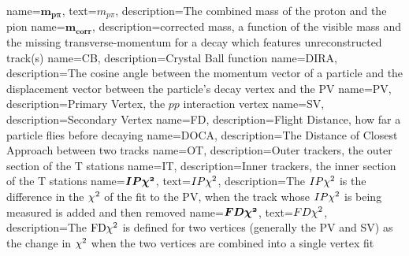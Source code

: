                  {
                    name=$\mathbold{m_{p\pi}}$,
                     text=$m_{p\pi}$,
                   description={The combined mass of the proton and the pion}
                 }
                 {
                   name=$\mathbold{m_{corr}}$,
                   description={corrected mass, a function of the visible mass and the missing transverse-momentum for a decay which features unreconstructed track(s)}
                 }                 
                 {
                   name=CB,
                   description={Crystal Ball function}
                 }                 
                 {
                   name=DIRA,
                   description={The cosine angle between the momentum vector of a particle and the displacement vector between the particle's decay vertex and the \Gls{PV}}
                 }
                 {
                   name=PV,
                   description={Primary Vertex, the $pp$ interaction vertex}
                 }
                 {
                   name=SV,
                   description={Secondary Vertex}
                 }
                 {
                   name=FD,
                   description={Flight Distance, how far a particle flies before decaying}
                 }                                                                      
                 {
                   name=DOCA,
                   description={The Distance of Closest Approach between two tracks} 
                }
                 {
                   name=OT,
                   description={Outer trackers, the outer section of the T stations} 
                }
                 {
                   name=IT,
                   description={Inner trackers, the inner section of the T stations} 
                }                
                 {
                   name=$\mathbold{IP\chisq}$,
                   text=$IP\chi^2$,
                   description={The $IP\chi^2$ is the difference in the $\chi^2$ of the fit to the PV, when the track whose $IP\chi^2$ is being measured is added and then removed}
                 } 
                 {
                   name=$\mathbold{FD\chisq}$,
                   text=$FD\chi^2$,
                                    description={The $\mathrm{FD}\chi^2$ is defined for two vertices (generally the \Gls{PV} and \Gls{SV}) as the change in $\chi^2$ when the two vertices are combined into a single vertex fit}
                 }                
